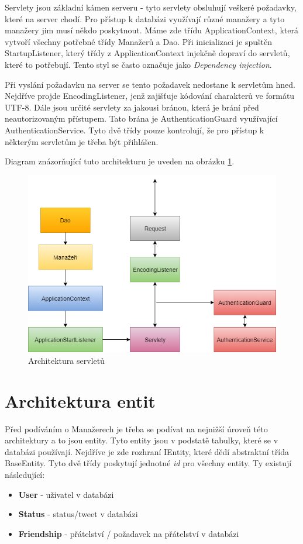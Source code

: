 \documentclass[
12pt,
a4paper,
pdftex,
czech,
titlepage
]{report}
\begin{document}
Servlety jsou základní kámen serveru - tyto servlety obsluhují veškeré požadavky, které na server chodí. Pro přístup k databázi využívají různé manažery a tyto manažery jim musí někdo poskytnout. Máme zde třídu ApplicationContext, která vytvoří všechny potřebné třídy Manažerů a Dao. Při inicializaci je spuštěn StartupListener, který třídy z ApplicationContext injekčně dopraví do servletů, které to potřebují. Tento styl se často označuje jako \textit{Dependency injection}. 

Při vyslání požadavku na server se tento požadavek nedostane k servletům hned. Nejdříve projde EncodingListener, jenž zajišťuje kódování charakterů ve formátu UTF-8. Dále jsou určité servlety za jakousi bránou, která je brání před neautorizovaným přístupem. Tato brána je AuthenticationGuard využívající AuthenticationService. Tyto dvě třídy pouze kontrolují, že pro přístup k některým servletům je třeba být přihlášen.

Diagram znázorňující tuto architekturu je uveden na obrázku \ref{servlety}.

\begin{figure}[H]
\caption{Architektura servletů}
\label{servlety}
\includegraphics[width=\textwidth]{servlety.png}
\end{figure}

\section{Architektura entit}
Před podíváním o Manažerech je třeba se podívat na nejnižší úroveň této architektury a to jsou entity. Tyto entity jsou v podstatě tabulky, které se v databázi používají. Nejdříve je zde rozhraní IEntity, které dědí abstraktní třída BaseEntity. Tyto dvě třídy poskytují jednotné \textit{id} pro všechny entity. Ty existují následující:
\begin{itemize}
\item \textbf{User} - uživatel v databázi
\item \textbf{Status} - status/tweet v databázi
\item \textbf{Friendship} - přátelství / požadavek na přátelství v databázi
\end{itemize}
\end{document}
